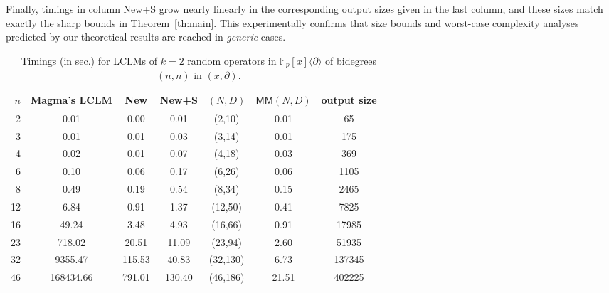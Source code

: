 \documentclass{sig-alt-full}
\def\MM {\ensuremath{\mathsf{MM}}}
\def\F {\ensuremath{\mathbb{F}}}
\newcommand{\x}{x}
\newcommand{\Dx}{\partial}
\begin{document}
Finally, timings in column {\sf New+S} grow nearly linearly in the
corresponding output sizes given in the last column, and these sizes match
exactly the sharp bounds in Theorem~\ref{th:main}. This experimentally
confirms that size bounds and worst-case complexity analyses predicted by our
theoretical results 
are reached in \emph{generic\/} cases.

\begin{table}[t]
\begin{scriptsize}
\begin{center}
\begin{tabular}{r|ccccccc}
$n$ & \sf Magma's LCLM & \sf New &  \sf New+S & $(N,D)$& $\MM(N,D)$& \sf output size \\
\hline
 2 & 0.01 & 0.00 & 0.01 & (2,10) & 0.01 & 65 &  \\
 3 & 0.01 & 0.01 & 0.03 & (3,14) & 0.01 & 175 &  \\
 4 & 0.02 & 0.01 & 0.07 & (4,18) & 0.03 & 369 &  \\
 6 & 0.10 & 0.06 & 0.17 & (6,26) & 0.06 & 1105 &  \\
 8 & 0.49 & 0.19 & 0.54 & (8,34) & 0.15 & 2465 &  \\
12 & 6.84 & 0.91 & 1.37 & (12,50) & 0.41 & 7825 &  \\
16 & 49.24 & 3.48 & 4.93 & (16,66) & 0.91 & 17985 &  \\
23 & 718.02 & 20.51 & 11.09 & (23,94) & 2.60 & 51935 &  \\
32 & 9355.47 & 115.53 & 40.83 & (32,130) & 6.73 & 137345 &  \\ 
46 & 168434.66 & 791.01 & 130.40 & (46,186) &  21.51 & 402225 \\
\end{tabular}
\end{center}
\end{scriptsize}
\vskip-12pt
\begin{small}
\caption{Timings (in sec.) for LCLMs of $k=2$ random operators in $\F_p[\x]\langle
\Dx\rangle$ of bidegrees $(n,n)$ in $(x,\Dx)$. }\label{tab:Magma-lclms} 
\end{small}
\end{table}

\scriptsize
\end{document}

